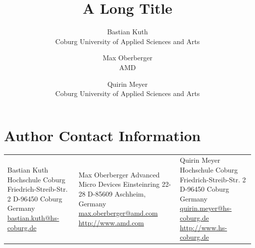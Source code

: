 \documentclass{download/jcgt-template/jcgt}
\begin{document}
\title{A Long Title}

\author
       {Bastian Kuth\\Coburg University of Applied Sciences and Arts
        \and Max Oberberger\\AMD 
        \and Quirin Meyer\\Coburg University of Applied Sciences and Arts
       }

\teaser{}

\maketitle
\thispagestyle{firstpagestyle}

\begin{abstract}
\small

\end{abstract}



 



\section*{Author Contact Information}

\hspace{-2mm}\begin{tabular}{p{}p{}p{}}
Bastian Kuth \newline
Hochschule Coburg \newline
Friedrich-Streib-Str. 2 \newline
D-96450 Coburg \newline
Germany  \newline
\href{mailto:bastian.kuth@hs-coburg.de}{bastian.kuth@hs-coburg.de}
&
Max Oberberger \newline
Advanced Micro Devices\newline
Einsteinring 22-28\newline
D-85609 Aschheim, \newline
Germany  \newline
\href{mailto:max.oberberger@amd.com}{max.oberberger@amd.com}
\href{http://www.amd.com}{http://www.amd.com}
&
Quirin Meyer \newline
Hochschule Coburg \newline
Friedrich-Streib-Str. 2 \newline
D-96450 Coburg \newline
Germany  \newline
\href{mailto:quirin.meyer@hs-coburg.de}{quirin.meyer@hs-coburg.de}
\href{http://www.hs-coburg.de}{http://www.hs-coburg.de}

\end{tabular}

\afterdoc
\end{document}
